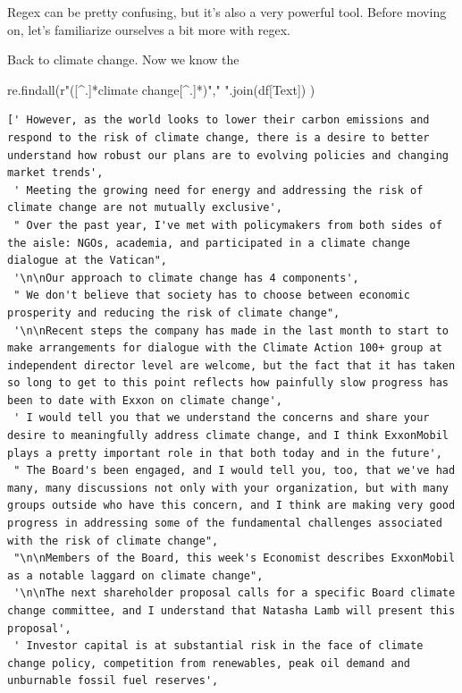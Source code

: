 \documentclass[
  letterpaper,
  DIV=11,
  numbers=noendperiod]{scrreprt}
\newenvironment{Shaded}{\begin{snugshade}}{\end{snugshade}}
\newcommand{\NormalTok}[1]{\textcolor[rgb]{0.00,0.23,0.31}{#1}}
\newcommand{\StringTok}[1]{\textcolor[rgb]{0.13,0.47,0.30}{#1}}
\newcommand{\VerbatimStringTok}[1]{\textcolor[rgb]{0.13,0.47,0.30}{#1}}
\begin{document}
Regex can be pretty confusing, but it's also a very powerful tool.
Before moving on, let's familiarize ourselves a bit more with regex.

Back to climate change. Now we know the

\begin{Shaded}
\begin{Highlighting}[]
\NormalTok{re.findall(}\VerbatimStringTok{r"([\^{}.]*climate change[\^{}.]*)"}\NormalTok{,}\StringTok{" "}\NormalTok{.join(df[}\StringTok{\textquotesingle{}Text\textquotesingle{}}\NormalTok{]) )}
\end{Highlighting}
\end{Shaded}

\begin{verbatim}
[' However, as the world looks to lower their carbon emissions and respond to the risk of climate change, there is a desire to better understand how robust our plans are to evolving policies and changing market trends',
 ' Meeting the growing need for energy and addressing the risk of climate change are not mutually exclusive',
 " Over the past year, I've met with policymakers from both sides of the aisle: NGOs, academia, and participated in a climate change dialogue at the Vatican",
 '\n\nOur approach to climate change has 4 components',
 " We don't believe that society has to choose between economic prosperity and reducing the risk of climate change",
 '\n\nRecent steps the company has made in the last month to start to make arrangements for dialogue with the Climate Action 100+ group at independent director level are welcome, but the fact that it has taken so long to get to this point reflects how painfully slow progress has been to date with Exxon on climate change',
 ' I would tell you that we understand the concerns and share your desire to meaningfully address climate change, and I think ExxonMobil plays a pretty important role in that both today and in the future',
 " The Board's been engaged, and I would tell you, too, that we've had many, many discussions not only with your organization, but with many groups outside who have this concern, and I think are making very good progress in addressing some of the fundamental challenges associated with the risk of climate change",
 "\n\nMembers of the Board, this week's Economist describes ExxonMobil as a notable laggard on climate change",
 '\n\nThe next shareholder proposal calls for a specific Board climate change committee, and I understand that Natasha Lamb will present this proposal',
 ' Investor capital is at substantial risk in the face of climate change policy, competition from renewables, peak oil demand and unburnable fossil fuel reserves',

\end{verbatim}
\end{document}
